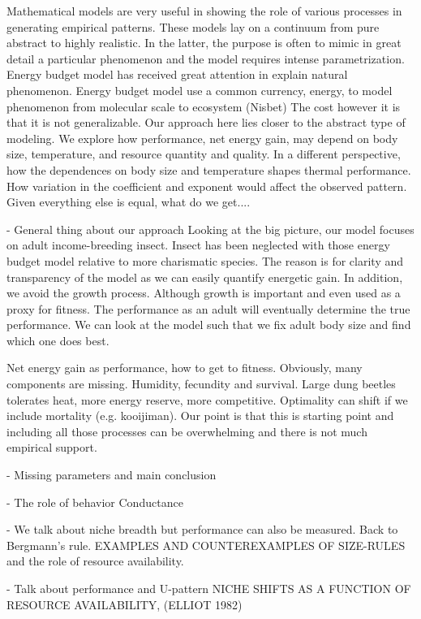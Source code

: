 Mathematical models are very useful in showing the role of various processes in generating empirical patterns.
These models lay on a continuum from pure abstract to highly realistic.
In the latter, the purpose is often to mimic in great detail a particular phenomenon and the model requires intense parametrization.
Energy budget model has received great attention in explain natural phenomenon.
Energy budget model use a common currency, energy, to model phenomenon from molecular scale to ecosystem (Nisbet)
The cost however it is that it is not generalizable.
Our approach here lies closer to the abstract type of modeling.
We explore how performance, net energy gain, may depend on body size, temperature, and resource quantity and quality. 
In a different perspective, how the dependences on body size and temperature shapes thermal performance.
How variation in the coefficient and exponent would affect the observed pattern.
Given everything else is equal, what do we get....

- General thing about our approach
Looking at the big picture, our model focuses on adult income-breeding insect.
Insect has been neglected with those energy budget model relative to more charismatic species.
The reason is for clarity and transparency of the model as we can easily quantify energetic gain.
In addition, we avoid the growth process.
Although growth is important and even used as a proxy for fitness.
The performance as an adult will eventually determine the true performance.
We can look at the model such that we fix adult body size and find which one does best. 

Net energy gain as performance, how to get to fitness.
Obviously, many components are missing.
Humidity, fecundity and survival.
Large dung beetles tolerates heat, more energy reserve, more competitive.
Optimality can shift if we include mortality (e.g. kooijiman).
Our point is that this is starting point and including all those processes can be overwhelming and there is not much empirical support.


- Missing parameters and main conclusion

 - The role of behavior
 Conductance
 
 - We talk about niche breadth but performance can also be measured.
 Back to Bergmann's rule.
  EXAMPLES AND COUNTEREXAMPLES OF SIZE-RULES 
 and the role of resource availability.
 
 - Talk about performance and U-pattern
 NICHE SHIFTS AS A FUNCTION OF RESOURCE AVAILABILITY, (ELLIOT 1982)
  
